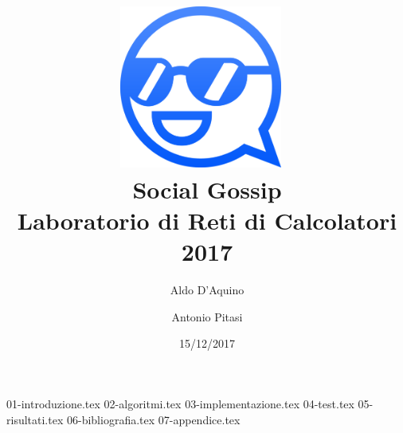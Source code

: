 \documentclass{article}
\title{%
\includegraphics[width=0.4\textwidth]{../images/logo.png}~ 
\\[3cm]
\Huge Social Gossip \\
\large Laboratorio di Reti di Calcolatori 2017}
\author{Aldo D'Aquino \and Antonio Pitasi}
\date{15/12/2017}
\begin{document}
\maketitle

\newpage

{01-introduzione.tex}
{02-algoritmi.tex}
{03-implementazione.tex}
{04-test.tex}
{05-risultati.tex}
{06-bibliografia.tex}
{07-appendice.tex}
\end{document}
